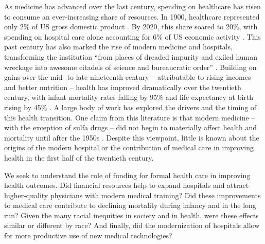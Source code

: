 \documentclass[12pt]{article}
\begin{document}

As medicine has advanced over the last century, spending on healthcare has risen to consume an ever-increasing share of resources. 
In 1900, healthcare represented only 2\% of US gross domestic product . 
By 2020, this share soared to 20\%, with spending on hospital care alone accounting for 6\% of US economic activity . 
This past century has also marked the rise of modern medicine and hospitals, transforming the institution ``from places of dreaded impurity and exiled human wreckage into awesome citadels of science and bureaucratic order'' . 
Building on gains over the mid- to late-nineteenth century -- attributable to rising incomes and better nutrition -- health has improved dramatically over the twentieth century, with infant mortality rates falling by 95\% and life expectancy at birth rising by 45\% . 
A large body of work has explored the drivers and the timing of this health transition. 
One claim from this literature is that modern medicine -- with the exception of sulfa drugs -- did not begin to materially affect health and mortality until after the 1950s .
Despite this viewpoint, little is known about the origins of the modern hospital or the contribution of medical care in improving health in the first half of the twentieth century.




We seek to understand the role of funding for formal health care in improving health outcomes.
Did financial resources help to expand hospitals and attract higher-quality physicians with modern medical training? 
Did these improvements to medical care contribute to declining mortality during infancy and in the long run?
Given the many racial inequities in society and in health, were these effects similar or different by race?
And finally, did the modernization of hospitals allow for more productive use of new medical technologies?
\end{document}
